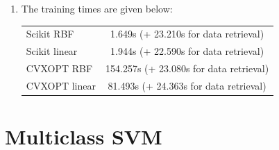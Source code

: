 \begin{enumerate}[label=(\alph*)]
\begin{enumerate}[label=\roman*.]
        \item The training times are given below:
            \begin{center}
                \begin{tabular}{|l|c|}
                    \hline
                    Scikit RBF & 1.649s (+ 23.210s for data retrieval) \\
                    Scikit linear & 1.944s (+ 22.590s for data retrieval)\\
                    CVXOPT RBF & 154.257s (+ 23.080s for data retrieval)\\
                    CVXOPT linear & 81.493s (+ 24.363s for data retrieval)\\
                    \hline
                \end{tabular}
            \end{center}
    \end{enumerate}

\end{enumerate}

\section{Multiclass SVM}

